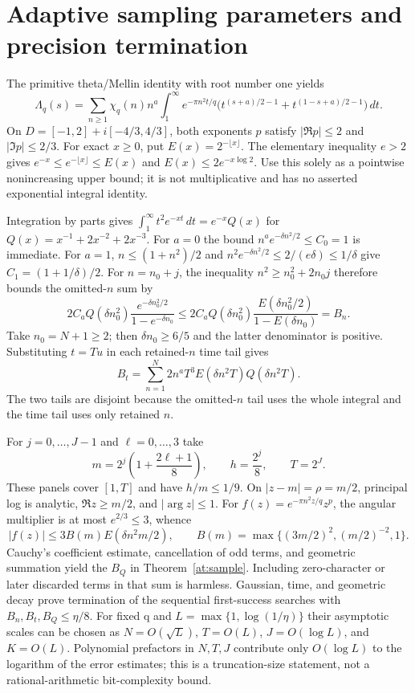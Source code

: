 \section{Adaptive sampling parameters and precision termination}\label{at:details}
The primitive theta/Mellin identity with root number one yields
\[
 \Lambda_q(s)=\sum_{n\ge1}\chi_q(n)n^a
 \int_1^\infty e^{-\pi n^2t/q}
 \bigl(t^{(s+a)/2-1}+t^{(1-s+a)/2-1}\bigr)\,dt.
\]
On $D=[-1,2]+i[-4/3,4/3]$, both exponents $p$ satisfy
$|\Re p|\le2$ and $|\Im p|\le2/3$.
For exact $x\ge0$, put $E(x)=2^{-\lfloor x\rfloor}$.
The elementary inequality $e>2$ gives
$e^{-x}\le e^{-\lfloor x\rfloor}\le E(x)$ and
$E(x)\le2e^{-x\log2}$.
Use this solely as a pointwise nonincreasing upper bound; it is not
multiplicative and has no asserted exponential integral identity.

Integration by parts gives
$\int_1^\infty t^2e^{-xt}\,dt=e^{-x}Q(x)$ for
$Q(x)=x^{-1}+2x^{-2}+2x^{-3}$.
For $a=0$ the bound $n^ae^{-\delta n^2/2}\le C_0=1$ is immediate.
For $a=1$, $n\le(1+n^2)/2$ and
$n^2e^{-\delta n^2/2}\le2/(e\delta)\le1/\delta$ give
$C_1=(1+1/\delta)/2$.
For $n=n_0+j$, the inequality
$n^2\ge n_0^2+2n_0j$ therefore bounds the omitted-$n$ sum by
\[
 2C_aQ(\delta n_0^2)
 \frac{e^{-\delta n_0^2/2}}{1-e^{-\delta n_0}}
 \le2C_aQ(\delta n_0^2)
 \frac{E(\delta n_0^2/2)}{1-E(\delta n_0)}=B_n.
\]
Take $n_0=N+1\ge2$; then $\delta n_0\ge6/5$ and the latter denominator
is positive. Substituting $t=Tu$ in each retained-$n$ time tail gives
\[
 B_t=\sum_{n=1}^N2n^aT^3E(\delta n^2T)Q(\delta n^2T).
\]
The two tails are disjoint because the omitted-$n$ tail uses the whole
integral and the time tail uses only retained $n$.

For $j=0,\ldots,J-1$ and $\ell=0,\ldots,3$ take
\[
 m=2^j\left(1+\frac{2\ell+1}{8}\right),\qquad h=\frac{2^j}{8},
 \qquad T=2^J.
\]
These panels cover $[1,T]$ and have $h/m\le1/9$.
On $|z-m|=\rho=m/2$, principal log is analytic,
$\Re z\ge m/2$, and $|\arg z|\le1$.
For $f(z)=e^{-\pi n^2z/q}z^p$, the angular multiplier is at most
$e^{2/3}\le3$, whence
\[
 |f(z)|\le3B(m)E(\delta n^2m/2),\qquad
 B(m)=\max\{(3m/2)^2,(m/2)^{-2},1\}.
\]
Cauchy's coefficient estimate, cancellation of odd terms, and geometric
summation yield the $B_Q$ in Theorem~\ref{at:sample}.
Including zero-character or later discarded terms in that sum is harmless.
Gaussian, time, and geometric decay prove termination of the sequential
first-success searches with $B_n,B_t,B_Q\le\eta/8$.
For fixed q and $L=\max\{1,\log(1/\eta)\}$ their asymptotic scales can be
chosen as $N=O(\sqrt L)$, $T=O(L)$, $J=O(\log L)$, and $K=O(L)$.
Polynomial prefactors in $N,T,J$ contribute only $O(\log L)$ to the
logarithm of the error estimates; this is a truncation-size statement,
not a rational-arithmetic bit-complexity bound.

